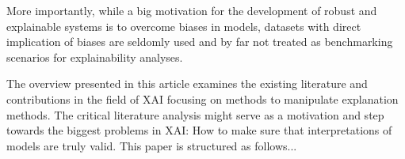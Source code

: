 More importantly, while a big motivation for the development of robust and explainable systems is to overcome biases in models, datasets with direct implication of biases are seldomly used and by far not treated as benchmarking scenarios for explainability analyses.  






The overview presented in this article examines the existing literature and contributions in the field of XAI focusing on methods to manipulate explanation methods.  
The critical literature analysis might serve as a motivation and step towards the biggest problems in XAI: How to make sure that interpretations of models are truly valid. 
This paper is structured as follows... 
